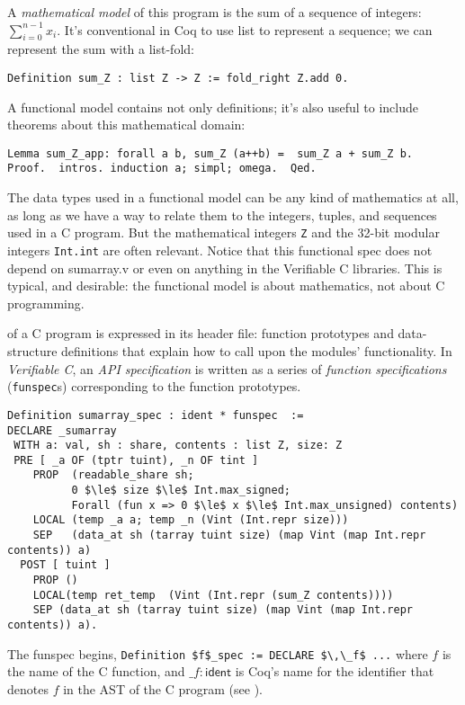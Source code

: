 \documentclass[12pt,fleqn,openany,oneside,showtrims]{memoir}
\begin{document}
A \emph{mathematical model} of this program is the sum of a sequence
of integers: $\sum_{i=0}^{n-1}x_i$.  It's conventional in Coq to use
\textsf{list} to represent a sequence; we can represent the sum
with a list-fold:
\begin{lstlisting}
Definition sum_Z : list Z -> Z := fold_right Z.add 0.
\end{lstlisting}
A functional model contains not only definitions; it's also
useful to include theorems about this mathematical domain:
\begin{lstlisting}
Lemma sum_Z_app: forall a b, sum_Z (a++b) =  sum_Z a + sum_Z b.
Proof.  intros. induction a; simpl; omega.  Qed.
\end{lstlisting}
The data types used in a functional model can be any kind of mathematics
at all, as long as we have a way to relate them to the integers,
tuples, and sequences used in a C program.  But the mathematical integers
\lstinline{Z} and the 32-bit modular integers
\lstinline{Int.int} are often relevant.
Notice that this functional spec does not depend
on sumarray.v or even on anything in the Verifiable C libraries.
This is typical, and desirable:
the functional model is about mathematics,
not about C programming.

 of a C program is
expressed in its header file: function prototypes and data-structure
definitions that explain how to call upon the modules' functionality.
In \emph{Verifiable C}, an \emph{API specification} is written as a
series of \emph{function specifications} (\lstinline{funspec}s)
corresponding to the function prototypes.

\label{refcard:sumarray-spec}
\begin{lstlisting}
Definition sumarray_spec : ident * funspec  :=
DECLARE _sumarray
 WITH a: val, sh : share, contents : list Z, size: Z
 PRE [ _a OF (tptr tuint), _n OF tint ]
    PROP  (readable_share sh;
          0 $\le$ size $\le$ Int.max_signed;
          Forall (fun x => 0 $\le$ x $\le$ Int.max_unsigned) contents)
    LOCAL (temp _a a; temp _n (Vint (Int.repr size)))
    SEP   (data_at sh (tarray tuint size) (map Vint (map Int.repr contents)) a)
  POST [ tuint ]
    PROP ()
    LOCAL(temp ret_temp  (Vint (Int.repr (sum_Z contents))))
    SEP (data_at sh (tarray tuint size) (map Vint (map Int.repr contents)) a).
\end{lstlisting}

The funspec begins, \lstinline{Definition $f$_spec := DECLARE $\,\_f$ ...}
where $f$ is the name of the C function, and $\_f : \mathsf{ident}$ is
Coq's name for the identifier that denotes $f$ in the AST of the C program
(see ).
\end{document}
